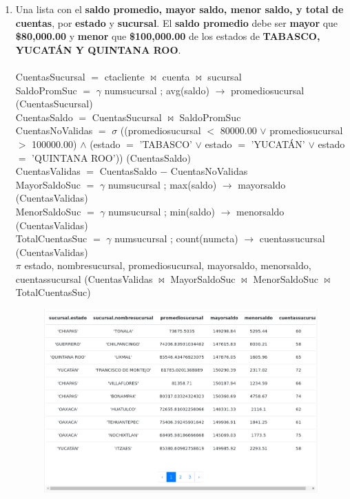 \documentclass{exam}
\begin{document}
\begin{questions}
\begin{enumerate}[label=\alph*.]
		
		\newpage
		\item Una lista con el \textbf{saldo promedio, mayor saldo, menor saldo, y total de cuentas}, por \textbf{estado} y \textbf{sucursal}. El \textbf{saldo promedio} debe ser \textbf{mayor} que \textbf{\$80,000.00} y \textbf{menor} que \textbf{\$100,000.00} de los estados de \textbf{TABASCO, YUCATÁN Y QUINTANA ROO}.\\\\
		CuentasSucursal $=$ ctacliente $\bowtie$ cuenta $\bowtie$ sucursal\\
		SaldoPromSuc $=$ $\gamma$ numsucursal ; avg(saldo) $\longrightarrow$ promediosucursal (CuentasSucursal)\\
		CuentasSaldo $=$ CuentasSucursal $\bowtie$ SaldoPromSuc\\
		CuentasNoValidas $=$ $\sigma$ ((promediosucursal $<$ 80000.00 $\vee$ promediosucursal $>$ 100000.00) $\wedge$ (estado $=$ 'TABASCO' $\vee$ estado $=$ 'YUCATÁN' $\vee$ estado $=$ 'QUINTANA ROO')) (CuentasSaldo)\\
		CuentasValidas $=$ CuentasSaldo $-$ CuentasNoValidas\\
		MayorSaldoSuc $=$ $\gamma$ numsucursal ; max(saldo) $\longrightarrow$ mayorsaldo (CuentasValidas)\\
		MenorSaldoSuc $=$ $\gamma$ numsucursal ; min(saldo) $\longrightarrow$ menorsaldo (CuentasValidas)\\
		TotalCuentasSuc $=$ $\gamma$ numsucursal ; count(numcta) $\longrightarrow$ cuentassucursal (CuentasValidas)\\
		$\pi$ estado, nombresucursal, promediosucursal, mayorsaldo, menorsaldo, cuentassucursal (CuentasValidas $\bowtie$ MayorSaldoSuc $\bowtie$ MenorSaldoSuc $\bowtie$ TotalCuentasSuc)\\
		\begin{center}
		\begin{figure}[h!]
			\includegraphics[width=17cm]{imgs/2h.png}
			\centering
		\end{figure}	
		\end{center}
		

\end{enumerate}
\end{questions}
\end{document}
